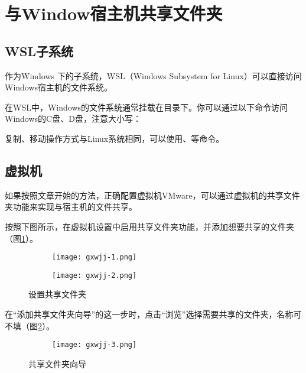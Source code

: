 

\section{与Window宿主机共享文件夹}
\label{sec:appendix-ubuntu-shared-folder}

\subsection{WSL子系统}
作为Windows 下的子系统，WSL（Windows Subsystem for Linux）可以直接访问Windows宿主机的文件系统。

在WSL中，Windows的文件系统通常挂载在目录下。你可以通过以下命令访问Windows的C盘、D盘，注意大小写：

复制、移动操作方式与Linux系统相同，可以使用、等命令。

\subsection{虚拟机}
如果按照文章开始的方法，正确配置虚拟机VMware，可以通过虚拟机的共享文件夹功能来实现与宿主机的文件共享。

按照下图所示，在虚拟机设置中启用共享文件夹功能，并添加想要共享的文件夹（图\ref{fig:shared-folder-setup}）。
\begin{figure}[h]
    \centering
    \begin{subfigure}[c]{0.6\textwidth}
      \texttt{[image: gxwjj-1.png]}
    \end{subfigure}
    \hfill
    \begin{subfigure}[c]{0.35\textwidth}
      \texttt{[image: gxwjj-2.png]}
    \end{subfigure}
    \caption{设置共享文件夹}
    \label{fig:shared-folder-setup}
\end{figure}

在“添加共享文件夹向导”的这一步时，点击“浏览”选择需要共享的文件夹，名称可不填（图\ref{fig:shared-folder-wizard}）。
\begin{figure}[h]
    \centering
    \begin{subfigure}[c]{0.5\textwidth}
    \texttt{[image: gxwjj-3.png]}
    \end{subfigure}    
    \caption{共享文件夹向导}
    \label{fig:shared-folder-wizard}
\end{figure}

